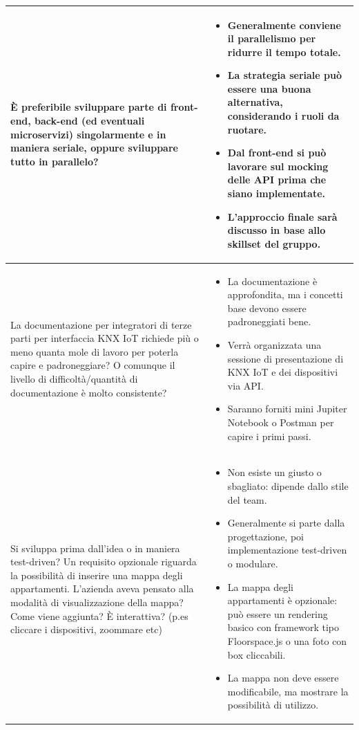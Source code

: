\documentclass[a4paper,11pt]{article}
\begin{document}
{\begin{tabularx}{\textwidth}{|>{\raggedright\arraybackslash}X|>{\raggedright\arraybackslash}X|}
\hline
È preferibile sviluppare parte di front-end, back-end (ed eventuali microservizi) singolarmente e in maniera seriale, oppure sviluppare tutto in parallelo?
&
\begin{itemize}
\item Generalmente conviene il parallelismo per ridurre il tempo totale.
\item La strategia seriale può essere una buona alternativa, considerando i ruoli da ruotare.
\item Dal front-end si può lavorare sul mocking delle API prima che siano implementate.
\item L'approccio finale sarà discusso in base allo skillset del gruppo.
\end{itemize} \\
\hline
La documentazione per integratori di terze parti per interfaccia KNX IoT richiede più o meno quanta mole di lavoro per poterla capire e padroneggiare? O comunque il livello di difficoltà/quantità di documentazione è molto consistente?
&
\begin{itemize}
\item La documentazione è approfondita, ma i concetti base devono essere padroneggiati bene.
\item Verrà organizzata una sessione di presentazione di KNX IoT e dei dispositivi via API.
\item Saranno forniti mini Jupiter Notebook o Postman per capire i primi passi.
\end{itemize} \\
\hline
Si sviluppa prima dall'idea o in maniera test-driven? Un requisito opzionale riguarda la possibilità di inserire una mappa degli appartamenti. L'azienda aveva pensato alla modalità di visualizzazione della mappa? Come viene aggiunta? È interattiva? (p.es cliccare i dispositivi, zoommare etc)
&
\begin{itemize}
\item Non esiste un giusto o sbagliato: dipende dallo stile del team.
\item Generalmente si parte dalla progettazione, poi implementazione test-driven o modulare.
\item La mappa degli appartamenti è opzionale: può essere un rendering basico con framework tipo Floorspace.js o una foto con box cliccabili.
\item La mappa non deve essere modificabile, ma mostrare la possibilità di utilizzo.
\end{itemize} \\
\hline
\end{tabularx}
}
\end{document}
